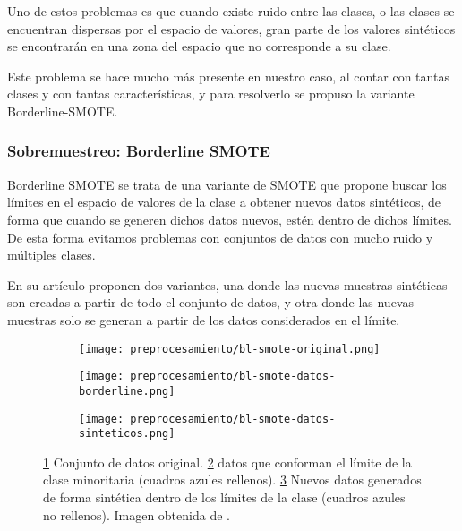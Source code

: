 Uno de estos problemas es que cuando existe ruido entre las clases, o las clases se encuentran dispersas por el espacio de valores, gran parte de los valores sintéticos se encontrarán en una zona del espacio que no corresponde a su clase.

Este problema se hace mucho más presente en nuestro caso, al contar con tantas clases y con tantas características, y para resolverlo se propuso la variante Borderline-SMOTE.



\subsubsection{Sobremuestreo: Borderline SMOTE}

Borderline SMOTE \cite{BL-SMOTE} se trata de una variante de SMOTE que propone buscar los límites en el espacio de valores de la clase a obtener nuevos datos sintéticos, de forma que cuando se generen dichos datos nuevos, estén dentro de dichos límites. De esta forma evitamos problemas con conjuntos de datos con mucho ruido y múltiples clases.

En su artículo proponen dos variantes, una donde las nuevas muestras sintéticas son creadas a partir de todo el conjunto de datos, y otra donde las nuevas muestras solo se generan a partir de los datos considerados en el límite.


\begin{figure}[H]
    \centering
    \begin{subfigure}[b]{0.33\textwidth}
		  \texttt{[image: preprocesamiento/bl-smote-original.png]}
        \caption{}
        \label{fig:blSMOTE-orig}
    \end{subfigure}
    \begin{subfigure}[b]{0.33\textwidth}
        \texttt{[image: preprocesamiento/bl-smote-datos-borderline.png]}
        \caption{}
        \label{fig:blSMOTE-border}
    \end{subfigure}
    \begin{subfigure}[b]{0.33\textwidth}
        \texttt{[image: preprocesamiento/bl-smote-datos-sinteticos.png]}
        \caption{}
        \label{fig:blSMOTE-sintetico}
    \end{subfigure}

    \caption{\ref{fig:blSMOTE-orig} Conjunto de datos original. \ref{fig:blSMOTE-border} datos que conforman el límite de la clase minoritaria (cuadros azules rellenos). \ref{fig:blSMOTE-sintetico} Nuevos datos generados de forma sintética dentro de los límites de la clase (cuadros azules no rellenos). Imagen obtenida de \cite{BL-SMOTE}.}
	 \label{fig:ejemploBL-SMOTE}

\end{figure}

